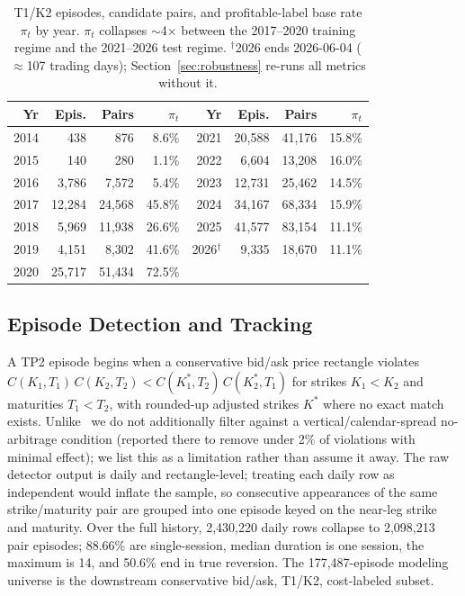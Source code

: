 \documentclass[sigconf,review]{acmart}
\begin{document}
\begin{table}[t]
\centering
\footnotesize
\begin{tabular}{rrrr@{\hskip 1.4em}rrrr}
\toprule
Yr & Epis. & Pairs & $\pi_t$ & Yr & Epis. & Pairs & $\pi_t$ \\
\midrule
2014 & 438 & 876 & 8.6\% & 2021 & 20{,}588 & 41{,}176 & 15.8\% \\
2015 & 140 & 280 & 1.1\% & 2022 & 6{,}604 & 13{,}208 & 16.0\% \\
2016 & 3{,}786 & 7{,}572 & 5.4\% & 2023 & 12{,}731 & 25{,}462 & 14.5\% \\
2017 & 12{,}284 & 24{,}568 & 45.8\% & 2024 & 34{,}167 & 68{,}334 & 15.9\% \\
2018 & 5{,}969 & 11{,}938 & 26.6\% & 2025 & 41{,}577 & 83{,}154 & 11.1\% \\
2019 & 4{,}151 & 8{,}302 & 41.6\% & 2026$^\dagger$ & 9{,}335 & 18{,}670 & 11.1\% \\
2020 & 25{,}717 & 51{,}434 & 72.5\% & & & & \\
\bottomrule
\end{tabular}
\caption{T1/K2 episodes, candidate pairs, and profitable-label base rate $\pi_t$ by year. $\pi_t$ collapses $\sim$4$\times$ between the 2017--2020 training regime and the 2021--2026 test regime. $^\dagger$2026 ends 2026-06-04 ($\approx$107 trading days); Section~\ref{sec:robustness} re-runs all metrics without it.}
\label{tab:peryear}
\end{table}

\subsection{Episode Detection and Tracking}
\label{sec:episode-tracking}
A TP2 episode begins when a conservative bid/ask price rectangle violates $C(K_1,T_1)\,C(K_2,T_2) < C(K_1^{\ast},T_2)\,C(K_2^{\ast},T_1)$ for strikes $K_1<K_2$ and maturities $T_1<T_2$, with rounded-up adjusted strikes $K^{\ast}$ where no exact match exists. Unlike~\cite{glasserman2025tp2} we do not additionally filter against a vertical/calendar-spread no-arbitrage condition (reported there to remove under 2\% of violations with minimal effect); we list this as a limitation rather than assume it away. The raw detector output is daily and rectangle-level; treating each daily row as independent would inflate the sample, so consecutive appearances of the same strike/maturity pair are grouped into one episode keyed on the near-leg strike and maturity. Over the full history, 2{,}430{,}220 daily rows collapse to 2{,}098{,}213 pair episodes; 88.66\% are single-session, median duration is one session, the maximum is 14, and 50.6\% end in true reversion. The 177{,}487-episode modeling universe is the downstream conservative bid/ask, T1/K2, cost-labeled subset.
\end{document}
